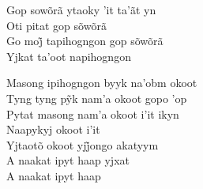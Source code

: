 \bigskip

\begin{linenumbers}
 
\noindent   Gop sowõrã ytaoky 'it ta'ãt yn\\
  Oti pitat gop sõwõrã\\
  Go moj̃ tapihogngon gop sõwõrã\\
  Yjkat ta'oot napihogngon
 
\end{linenumbers}

\bigskip

\begin{linenumbers}
 
\noindent   Masong ipihogngon byyk na'obm okoot\\
  Tyng tyng pỹk nam’a okoot gopo ’op\\
  Pytat masong nam'a okoot i'it ikyn\\
  Naapykyj okoot i'it\\
  Yjtaotõ okoot yjj̃ongo akatyym\\
  A naakat ipyt haap yjxat\\
  A naakat ipyt haap
 
\end{linenumbers}

\bigskip

